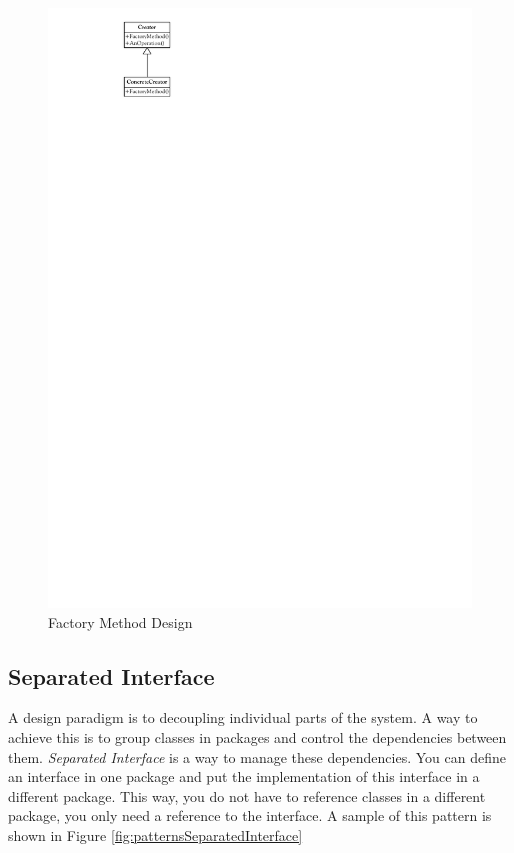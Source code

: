 			\begin{figure}[htb]
				\begin{center}
					\includegraphics{./files/inc/figures/patternsFactoryMethod}
					\caption{\label{fig:patternsFactoryMethod} Factory Method Design}
				\end{center}
			\end{figure}

			
		\subsection{Separated Interface}
		\label{subsec:separatedInterface}
			A design paradigm is to decoupling individual parts of the system. A way to achieve this is
			to group classes in packages and control the dependencies between them. \textit{Separated Interface}
			is a way to manage these dependencies. You can define an interface in one package and put
			the implementation of this interface in a different package. This way, you do not have to
			reference classes in a different package, you only need a reference to the interface.
			A sample of this pattern is shown in Figure \ref{fig:patternsSeparatedInterface}
		
